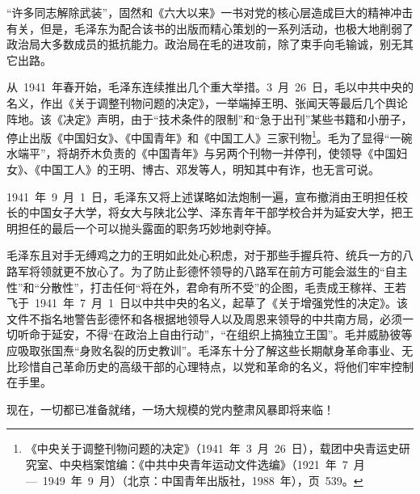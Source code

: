 “许多同志解除武装”，固然和《六大以来》一书对党的核心层造成巨大的精神冲击有关，但是，毛泽东为配合该书的出版而精心策划的一系列活动，也极大地削弱了政治局大多数成员的抵抗能力。政治局在毛的进攻前，除了束手向毛输诚，别无其它出路。

从~1941~年春开始，毛泽东连续推出几个重大举措。3~月~26~日，毛以中共中央的名义，作出《关于调整刊物问题的决定》，一举端掉王明、张闻天等最后几个舆论阵地。该《决定》声明，由于“技术条件的限制”和“急于出刊”某些书籍和小册子，停止出版《中国妇女》、《中国青年》和《中国工人》三家刊物\footnote{《中央关于调整刊物问题的决定》（1941~年~3~月~26~日），载团中央青运史研究室、中央档案馆编：《中共中央青年运动文件选编》（1921~年~7~月—~1949~年~9~月）（北京：中国青年出版社，1988~年），页~539。}。毛为了显得“一碗水端平”，将胡乔木负责的《中国青年》与另两个刊物一并停刊，使领导《中国妇女》、《中国工人》的王明、博古、邓发等人，明知其中有诈，也无言可说。

1941~年~9~月~1~日，毛泽东又将上述谋略如法炮制一遍，宣布撤消由王明担任校长的中国女子大学，将女大与陕北公学、泽东青年干部学校合并为延安大学，把王明担任的最后一个可以抛头露面的职务巧妙地剥夺掉。

毛泽东且对手无缚鸡之力的王明如此处心积虑，对于那些手握兵符、统兵一方的八路军将领就更不放心了。为了防止彭德怀领导的八路军在前方可能会滋生的“自主性”和“分散性”，打击任何“将在外，君命有所不受”的企图，毛责成王稼祥、王若飞于~1941~年~7~月~1~日以中共中央的名义，起草了《关于增强党性的决定》。该文件不指名地警告彭德怀和各根据地领导人以及周恩来领导的中共南方局，必须一切听命于延安，不得“在政治上自由行动”，“在组织上搞独立王国”。毛并威胁彼等应吸取张国焘“身败名裂的历史教训”。毛泽东十分了解这些长期献身革命事业、无比珍惜自己革命历史的高级干部的心理特点，以党和革命的名义，将他们牢牢控制在手里。

现在，一切都已准备就绪，一场大规模的党内整肃风暴即将来临！